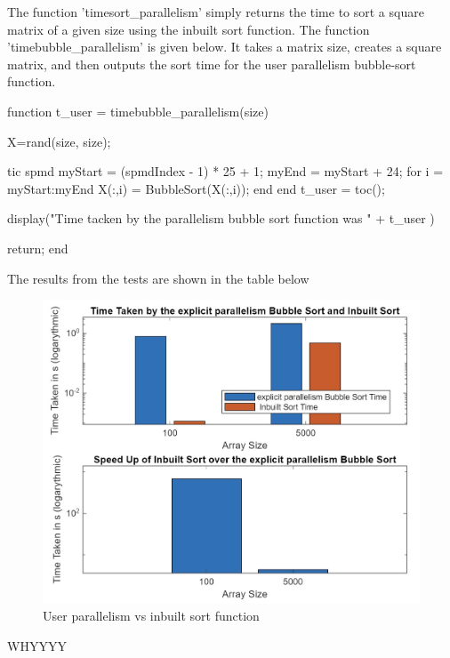 The function 'timesort\_parallelism' simply returns the time to sort a square matrix of a given size using the inbuilt sort function.
The function 'timebubble\_parallelism' is given below.
It takes a matrix size, creates a square matrix, and then outputs the sort time for the user parallelism bubble-sort function.

\begin{Matlab}
 function t_user = timebubble_parallelism(size)

  X=rand(size, size);

  tic
  spmd
   myStart = (spmdIndex - 1) * 25 + 1;
   myEnd = myStart + 24;
   for i = myStart:myEnd
    X(:,i) = BubbleSort(X(:,i));
   end
  end
  t_user = toc();

  display("Time tacken by the parallelism bubble sort function was " + t_user )

  return;
 end
\end{Matlab}

The results from the tests are shown in the table below


\begin{figure}[H]
 \centering
 \includegraphics[width=0.6\columnwidth]{Figures/expPar}
 \caption{User parallelism vs inbuilt sort function}
 \label{fig:expPar}
\end{figure}

WHYYYY